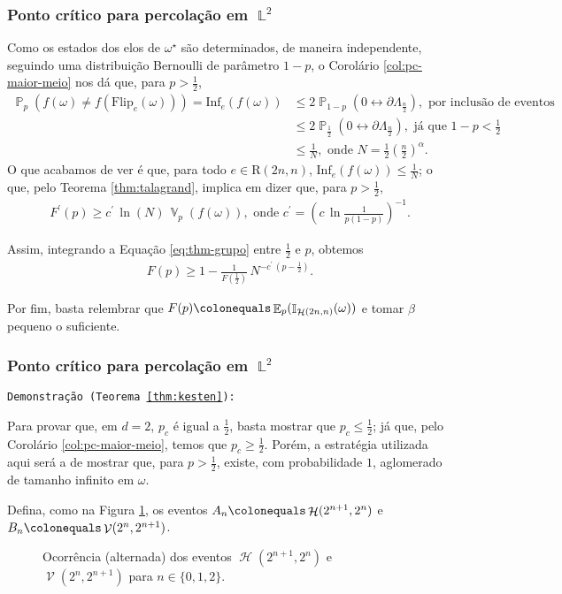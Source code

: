 \documentclass[9pt]{beamer}
\theoremstyle{definition} %
\DeclareMathOperator{\PX}{\mathbb{P}} %
\DeclareMathOperator{\EX}{\mathbb{E}} %
\DeclareMathOperator{\VX}{\mathbb{V}} %
\DeclareMathOperator{\IX}{\mathbb{I}} %
\DeclareMathOperator{\LX}{\mathbb{L}} %
\DeclareMathOperator{\HL}{\mathcal{H}} %
\DeclareMathOperator{\VL}{\mathcal{V}} %
\newcommand{\flipe}{\text{Flip}_e(\omega)}
\newcommand{\infle}{\text{Inf}_e(f(\omega))}
\begin{document}
	\begin{frame}[t]
		\frametitle{Ponto crítico para percolação em $\LX^2$}
		Como os estados dos elos de $\omega^{\star}$ são determinados, de maneira independente, seguindo uma distribuição Bernoulli de parâmetro $1 - p$, o Corolário \ref{col:pc-maior-meio} nos dá que, para $p > \frac{1}{2}$, 
		\begin{align*}
		\PX_p(f(\omega) \neq f(\flipe)) = \infle &\leq 2\PX_{1-p}\left(0 \leftrightarrow \partial\Lambda_{\frac{n}{2}}\right), \text{ por inclusão de eventos} \\
		&\leq 2\PX_{\frac{1}{2}}\left(0 \leftrightarrow \partial\Lambda_{\frac{n}{2}}\right), \text{ já que $1 - p < \frac{1}{2}$} \\
		&\leq \frac{1}{N}, \text{ onde $N = \frac{1}{2}\left(\frac{n}{2}\right)^{\alpha}$}.
		\end{align*}\pause
		O que acabamos de ver é que, para todo $e \in \text{R}(2n ,n)$, $\infle \leq \frac{1}{N}$; o que, pelo Teorema \ref{thm:talagrand}, implica em dizer que, para $p > \frac{1}{2}$,
		\begin{align}\label{eq:thm-grupo}
		F^{\prime}(p) \geq c^{\prime}\,\ln(N)\,\VX_p(f(\omega)), \text{ onde } c^{\prime} = \left(c\,\ln\frac{1}{p(1-p)}\right)^{-1}.
		\end{align}
		
		Assim, integrando a Equação \ref{eq:thm-grupo} entre $\frac{1}{2}$ e $p$, obtemos
		\begin{align*}
		F(p) \geq 1 - \frac{1}{F\left(\frac{1}{2}\right)} \, N^{-c^{\prime}\,\left(p - \frac{1}{2}\right)}.
		\end{align*}
		
		Por fim, basta relembrar que $F(p) \colonequals \EX_p(\IX_{\HL(2n, n)}(\omega))$ e tomar $\beta$ pequeno o suficiente.
	\end{frame}

	\begin{frame}[t]
		\frametitle{Ponto crítico para percolação em $\LX^2$}
		\texttt{Demonstração (Teorema \ref{thm:kesten}):}
			
		Para provar que, em $d = 2$, $p_c$ é igual a $\frac{1}{2}$, basta mostrar que $p_c \leq \frac{1}{2}$; já que, pelo Corolário \ref{col:pc-maior-meio}, temos que $p_c \geq \frac{1}{2}$. Porém, a estratégia utilizada aqui será a de mostrar que, para $p > \frac{1}{2}$, existe, com probabilidade $1$, aglomerado de tamanho infinito em $\omega$.\pause
		
		Defina, como na Figura \ref{fig:caixas-iteradas}, os eventos $A_n \colonequals \HL(2^{n+1}, 2^n)$ e $B_n \colonequals \VL(2^n, 2^{n+1})$.
		
		\begin{figure}
			
			\vspace{-9pt}
			\caption{\justifying Ocorrência (alternada) dos eventos $\HL(2^{n+1}, 2^n)$ e $\VL(2^n, 2^{n+1})$ para $n \in \{0, 1, 2\}$.}
			\label{fig:caixas-iteradas}
		\end{figure}
	\end{frame}
\end{document}
